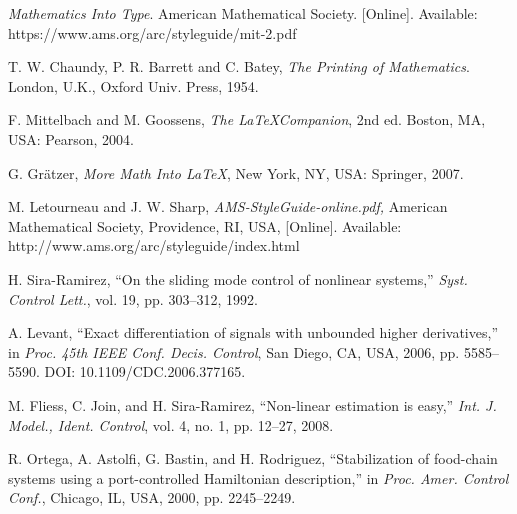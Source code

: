 \documentclass[journal,9pt]{IEEEtran}
\begin{document}
\begin{thebibliography}{1}
  

  {\it{Mathematics Into Type}}. American Mathematical Society. [Online]. Available: https://www.ams.org/arc/styleguide/mit-2.pdf

  T. W. Chaundy, P. R. Barrett and C. Batey, {\it{The Printing of Mathematics}}. London, U.K., Oxford Univ. Press, 1954.

  F. Mittelbach and M. Goossens, {\it{The \LaTeX Companion}}, 2nd ed. Boston, MA, USA: Pearson, 2004.

  G. Gr\"atzer, {\it{More Math Into LaTeX}}, New York, NY, USA: Springer, 2007.

  M. Letourneau and J. W. Sharp, {\it{AMS-StyleGuide-online.pdf,}} American Mathematical Society, Providence, RI, USA, [Online]. Available: http://www.ams.org/arc/styleguide/index.html

  H. Sira-Ramirez, ``On the sliding mode control of nonlinear systems,'' \textit{Syst. Control Lett.}, vol. 19, pp. 303--312, 1992.

  A. Levant, ``Exact differentiation of signals with unbounded higher derivatives,''  in \textit{Proc. 45th IEEE Conf. Decis.
    Control}, San Diego, CA, USA, 2006, pp. 5585--5590. DOI: 10.1109/CDC.2006.377165.

  M. Fliess, C. Join, and H. Sira-Ramirez, ``Non-linear estimation is easy,'' \textit{Int. J. Model., Ident. Control}, vol. 4, no. 1, pp. 12--27, 2008.

  R. Ortega, A. Astolfi, G. Bastin, and H. Rodriguez, ``Stabilization of food-chain systems using a port-controlled Hamiltonian description,'' in \textit{Proc. Amer. Control Conf.}, Chicago, IL, USA,
  2000, pp. 2245--2249.

\end{thebibliography}

\vfill
\end{document}
